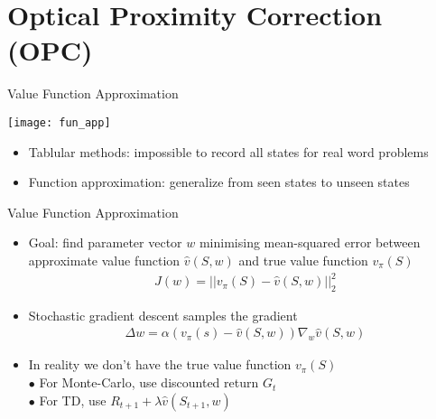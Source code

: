 \graphicspath{{./figs/repo/}{./figs/}}
\section{Optical Proximity Correction (OPC)}

\begin{frame}{Value Function Approximation}
    \begin{center}\texttt{[image: fun\_app]}\end{center}
    \begin{itemize}
        \item Tablular methods: impossible to record all states for real word problems 
        \item Function approximation: generalize from seen states to unseen states
    \end{itemize}
\end{frame}

\begin{frame}{Value Function Approximation}
    \begin{itemize}
        \item Goal: find parameter vector $w$ minimising mean-squared error between approximate value function $\hat{v}(S,w)$ and true value function $v_{\pi}(S)$
        \begin{align}
            \label{eq:1}
            J(w) = ||v_{\pi}(S)-\hat{v}(S,w)||_2^2
        \end{align}
        \item Stochastic gradient descent samples the gradient
        \begin{align}
            \label{eq:1}
            \Delta w = \alpha (v_{\pi}(s)-\hat{v}(S,w)) \nabla_{w}\hat{v}(S,w)
        \end{align}
        \item In reality we don't have the true value function $v_{\pi}(S)$\\
        \vspace{0.2cm}
        \hspace{0.5cm}$\bullet$ For Monte-Carlo, use discounted return $G_t$\\
        \vspace{0.2cm}
        \hspace{0.5cm}$\bullet$ For TD, use $R_{t+1}+\lambda \hat{v}(S_{t+1},w)$
        
    \end{itemize}
\end{frame}

